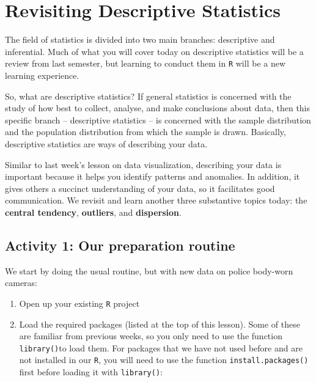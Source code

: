 \documentclass[
]{book}
\begin{document}
\hypertarget{revisiting-descriptive-statistics}{%
\section{Revisiting Descriptive Statistics}\label{revisiting-descriptive-statistics}}

The field of statistics is divided into two main branches: descriptive and inferential. Much of what you will cover today on descriptive statistics will be a review from last semester, but learning to conduct them in \texttt{R} will be a new learning experience.

So, what are descriptive statistics? If general statistics is concerned with the study of how best to collect, analyse, and make conclusions about data, then this specific branch -- descriptive statistics -- is concerned with the sample distribution and the population distribution from which the sample is drawn. Basically, descriptive statistics are ways of describing your data.

Similar to last week's lesson on data visualization, describing your data is important because it helps you identify patterns and anomalies. In addition, it gives others a succinct understanding of your data, so it facilitates good communication. We revisit and learn another three substantive topics today: the \textbf{central tendency}, \textbf{outliers}, and \textbf{dispersion}.

\hypertarget{activity-1-our-preparation-routine}{%
\subsection{Activity 1: Our preparation routine}\label{activity-1-our-preparation-routine}}

We start by doing the usual routine, but with new data on police body-worn cameras:

\begin{enumerate}
\def\labelenumi{\arabic{enumi}.}
\item
  Open up your existing \texttt{R} project
\item
  Load the required packages (listed at the top of this lesson). Some of these are familiar from previous weeks, so you only need to use the function \texttt{library()}to load them. For packages that we have not used before and are not installed in our \texttt{R}, you will need to use the function \texttt{install.packages()} first before loading it with \texttt{library()}:
\end{enumerate}
\end{document}

